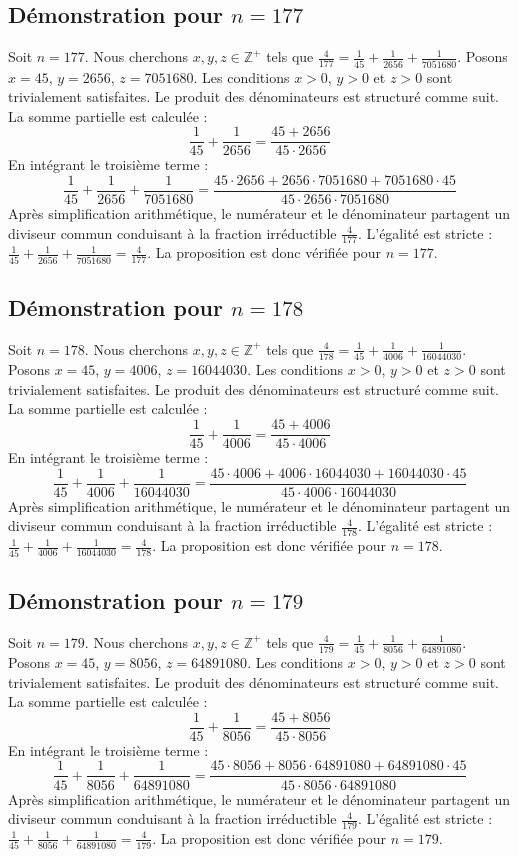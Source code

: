\documentclass[11pt,a4paper]{article}
\begin{document}
\subsection{Démonstration pour $n = 177$}
Soit $n = 177$. Nous cherchons $x, y, z \in \mathbb{Z}^{+}$ tels que $\frac{4}{177} = \frac{1}{45} + \frac{1}{2656} + \frac{1}{7051680}$.
Posons $x = 45$, $y = 2656$, $z = 7051680$.
Les conditions $x > 0$, $y > 0$ et $z > 0$ sont trivialement satisfaites.
Le produit des dénominateurs est structuré comme suit. La somme partielle est calculée :
$$ \frac{1}{45} + \frac{1}{2656} = \frac{45+2656}{45 \cdot 2656} $$
En intégrant le troisième terme :
$$ \frac{1}{45} + \frac{1}{2656} + \frac{1}{7051680} = \frac{45 \cdot 2656 + 2656 \cdot 7051680 + 7051680 \cdot 45}{45 \cdot 2656 \cdot 7051680} $$
Après simplification arithmétique, le numérateur et le dénominateur partagent un diviseur commun conduisant à la fraction irréductible $\frac{4}{177}$.
L'égalité est stricte : $\frac{1}{45} + \frac{1}{2656} + \frac{1}{7051680} = \frac{4}{177}$.
La proposition est donc vérifiée pour $n = 177$.
\subsection{Démonstration pour $n = 178$}
Soit $n = 178$. Nous cherchons $x, y, z \in \mathbb{Z}^{+}$ tels que $\frac{4}{178} = \frac{1}{45} + \frac{1}{4006} + \frac{1}{16044030}$.
Posons $x = 45$, $y = 4006$, $z = 16044030$.
Les conditions $x > 0$, $y > 0$ et $z > 0$ sont trivialement satisfaites.
Le produit des dénominateurs est structuré comme suit. La somme partielle est calculée :
$$ \frac{1}{45} + \frac{1}{4006} = \frac{45+4006}{45 \cdot 4006} $$
En intégrant le troisième terme :
$$ \frac{1}{45} + \frac{1}{4006} + \frac{1}{16044030} = \frac{45 \cdot 4006 + 4006 \cdot 16044030 + 16044030 \cdot 45}{45 \cdot 4006 \cdot 16044030} $$
Après simplification arithmétique, le numérateur et le dénominateur partagent un diviseur commun conduisant à la fraction irréductible $\frac{4}{178}$.
L'égalité est stricte : $\frac{1}{45} + \frac{1}{4006} + \frac{1}{16044030} = \frac{4}{178}$.
La proposition est donc vérifiée pour $n = 178$.
\subsection{Démonstration pour $n = 179$}
Soit $n = 179$. Nous cherchons $x, y, z \in \mathbb{Z}^{+}$ tels que $\frac{4}{179} = \frac{1}{45} + \frac{1}{8056} + \frac{1}{64891080}$.
Posons $x = 45$, $y = 8056$, $z = 64891080$.
Les conditions $x > 0$, $y > 0$ et $z > 0$ sont trivialement satisfaites.
Le produit des dénominateurs est structuré comme suit. La somme partielle est calculée :
$$ \frac{1}{45} + \frac{1}{8056} = \frac{45+8056}{45 \cdot 8056} $$
En intégrant le troisième terme :
$$ \frac{1}{45} + \frac{1}{8056} + \frac{1}{64891080} = \frac{45 \cdot 8056 + 8056 \cdot 64891080 + 64891080 \cdot 45}{45 \cdot 8056 \cdot 64891080} $$
Après simplification arithmétique, le numérateur et le dénominateur partagent un diviseur commun conduisant à la fraction irréductible $\frac{4}{179}$.
L'égalité est stricte : $\frac{1}{45} + \frac{1}{8056} + \frac{1}{64891080} = \frac{4}{179}$.
La proposition est donc vérifiée pour $n = 179$.
\end{document}
